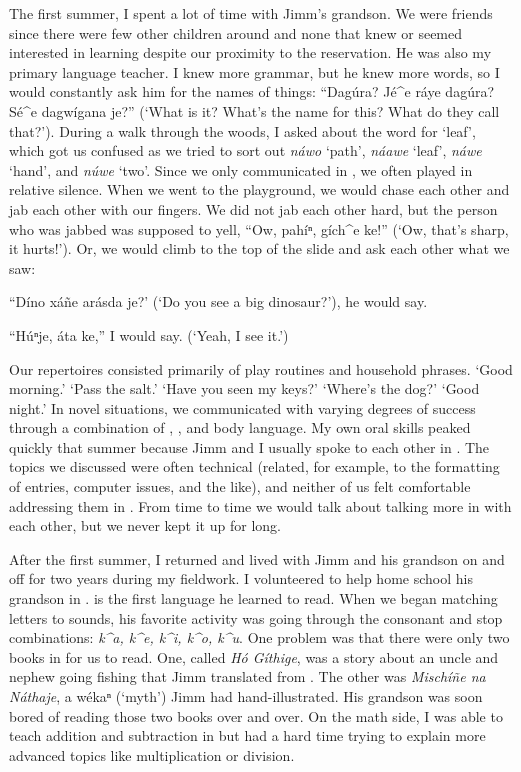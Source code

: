 \documentclass[output=paper]{LSP/langsci}
\begin{document}
The first summer, I spent a lot of time with Jimm's grandson. We were friends since there were few other children around and none that knew or seemed interested in learning  despite our proximity to the reservation. He was also my primary language teacher. I knew more grammar, but he knew more words, so I would constantly ask him for the names of things: ``Dagúra? Jé\^{ }e ráye dagúra? Sé\^{ }e dagwígana je?'' (`What is it? What's the name for this? What do they call that?'). During a walk through the woods, I asked about the  word for `leaf', which got us confused as we tried to sort out \emph{náwo} `path', \emph{náawe} `leaf', \emph{náwe} `hand', and \emph{núwe} `two'. Since we only communicated in , we often played in relative silence. When we went to the playground, we would chase each other and jab each other with our fingers. We did not jab each other hard, but the person who was jabbed was supposed to yell, ``Ow, pahíⁿ, gích\^{ }e ke!'' (`Ow, that's sharp, it hurts!'). Or, we would climb to the top of the slide and ask each other what we saw:

	``Díno xáñe arásda je?' (`Do you see a big dinosaur?'), he would say.
	
	``Húⁿje, áta ke,'' I would say. (`Yeah, I see it.')

Our  repertoires consisted primarily of play routines and household phrases. `Good morning.' `Pass the salt.' `Have you seen my keys?' `Where's the dog?' `Good night.' In novel situations, we communicated with varying degrees of success through a combination of , , and body language. My own oral  skills peaked quickly that summer because Jimm and I usually spoke to each other in . The topics we discussed were often technical (related, for example, to the formatting of  entries, computer issues, and the like), and neither of us felt comfortable addressing them in . From time to time we would talk about talking more in  with each other, but we never kept it up for long.

After the first summer, I returned and lived with Jimm and his grandson on and off for two years during my fieldwork. I volunteered to help home school his grandson in .  is the first language he learned to read. When we began matching letters to sounds, his favorite activity was going through the consonant and  stop combinations: \emph{k\^{ }a, k\^{ }e, k\^{ }i, k\^{ }o, k\^{ }u}. One problem was that there were only two books in  for us to read. One, called \emph{Hó Gíthige}, was a story about an uncle and nephew going fishing that Jimm translated from . The other was \emph{Mischíñe na Náthaje}, a wékaⁿ (`myth') Jimm had hand-illustrated. His grandson was soon bored of reading those two books over and over. On the math side, I was able to teach addition and subtraction in  but had a hard time trying to explain more advanced topics like multiplication or division.
\end{document}
